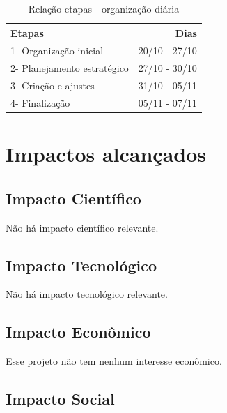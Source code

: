 \documentclass[a4paper,12pt]{article}  %
\begin{document}
\begin{table}[H]
\begin{center}
 \caption{Relação etapas - organização diária}
\begin{tabular}{|l|r|}
  \hline \hline
  Etapas & Dias  \\ \hline 
  1- Organização inicial &  20/10 - 27/10  \\ \hline
  2- Planejamento estratégico & 27/10 - 30/10 \\ \hline
  3- Criação e ajustes  &  31/10 - 05/11 \\ \hline
  4- Finalização & 05/11 - 07/11 \\ \hline
\end{tabular} 
\end{center}
\end{table}

\section{Impactos alcançados } %

 \subsection{Impacto Científico}

  Não há impacto científico relevante.

 \subsection{Impacto Tecnológico}

   Não há impacto tecnológico relevante.

 \subsection{Impacto Econômico}

   Esse projeto não tem nenhum interesse econômico.

 \subsection{Impacto Social}
\end{document}

